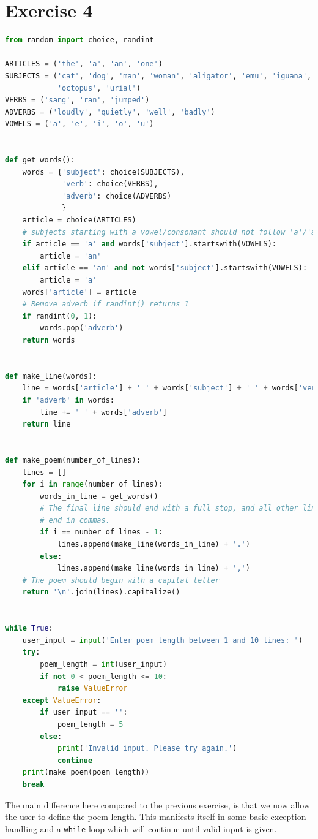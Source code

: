 \documentclass{report}
\begin{document}
\section*{Exercise 4}
\begin{lstlisting}[language=Python, style=pythonStyle]
from random import choice, randint

ARTICLES = ('the', 'a', 'an', 'one')
SUBJECTS = ('cat', 'dog', 'man', 'woman', 'aligator', 'emu', 'iguana',
            'octopus', 'urial')
VERBS = ('sang', 'ran', 'jumped')
ADVERBS = ('loudly', 'quietly', 'well', 'badly')
VOWELS = ('a', 'e', 'i', 'o', 'u')


def get_words():
    words = {'subject': choice(SUBJECTS),
             'verb': choice(VERBS),
             'adverb': choice(ADVERBS)
             }
    article = choice(ARTICLES)
    # subjects starting with a vowel/consonant should not follow 'a'/'an'
    if article == 'a' and words['subject'].startswith(VOWELS):
        article = 'an'
    elif article == 'an' and not words['subject'].startswith(VOWELS):
        article = 'a'
    words['article'] = article
    # Remove adverb if randint() returns 1
    if randint(0, 1):
        words.pop('adverb')
    return words


def make_line(words):
    line = words['article'] + ' ' + words['subject'] + ' ' + words['verb']
    if 'adverb' in words:
        line += ' ' + words['adverb']
    return line


def make_poem(number_of_lines):
    lines = []
    for i in range(number_of_lines):
        words_in_line = get_words()
        # The final line should end with a full stop, and all other lines
        # end in commas.
        if i == number_of_lines - 1:
            lines.append(make_line(words_in_line) + '.')
        else:
            lines.append(make_line(words_in_line) + ',')
    # The poem should begin with a capital letter
    return '\n'.join(lines).capitalize()


while True:
    user_input = input('Enter poem length between 1 and 10 lines: ')
    try:
        poem_length = int(user_input)
        if not 0 < poem_length <= 10:
            raise ValueError
    except ValueError:
        if user_input == '':
            poem_length = 5
        else:
            print('Invalid input. Please try again.')
            continue
    print(make_poem(poem_length))
    break
\end{lstlisting}
The main difference here compared to the previous exercise, is that we now allow the user to define the poem length. This manifests itself in some basic exception handling and a \verb|while| loop which will continue until valid input is given.\\
\end{document}
